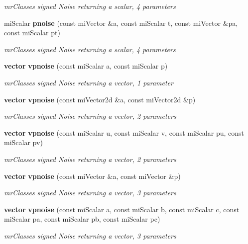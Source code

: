 \begin{CompactItemize}
\begin{CompactList}\small\item\em mr\-Classes signed Noise returning a scalar, 4 parameters \item\end{CompactList}\item 
mi\-Scalar {\bf pnoise} (const mi\-Vector \&a, const mi\-Scalar t, const mi\-Vector \&pa, const mi\-Scalar pt)
\begin{CompactList}\small\item\em mr\-Classes signed Noise returning a scalar, 4 parameters \item\end{CompactList}\item 
{\bf vector} {\bf vpnoise} (const mi\-Scalar a, const mi\-Scalar p)
\begin{CompactList}\small\item\em mr\-Classes signed Noise returning a vector, 1 parameter \item\end{CompactList}\item 
{\bf vector} {\bf vpnoise} (const mi\-Vector2d \&a, const mi\-Vector2d \&p)
\begin{CompactList}\small\item\em mr\-Classes signed Noise returning a vector, 2 parameters \item\end{CompactList}\item 
{\bf vector} {\bf vpnoise} (const mi\-Scalar u, const mi\-Scalar v, const mi\-Scalar pu, const mi\-Scalar pv)
\begin{CompactList}\small\item\em mr\-Classes signed Noise returning a vector, 2 parameters \item\end{CompactList}\item 
{\bf vector} {\bf vpnoise} (const mi\-Vector \&a, const mi\-Vector \&p)
\begin{CompactList}\small\item\em mr\-Classes signed Noise returning a vector, 3 parameters \item\end{CompactList}\item 
{\bf vector} {\bf vpnoise} (const mi\-Scalar a, const mi\-Scalar b, const mi\-Scalar c, const mi\-Scalar pa, const mi\-Scalar pb, const mi\-Scalar pc)
\begin{CompactList}\small\item\em mr\-Classes signed Noise returning a vector, 3 parameters \item\end{CompactList}\item 

\end{CompactItemize}
